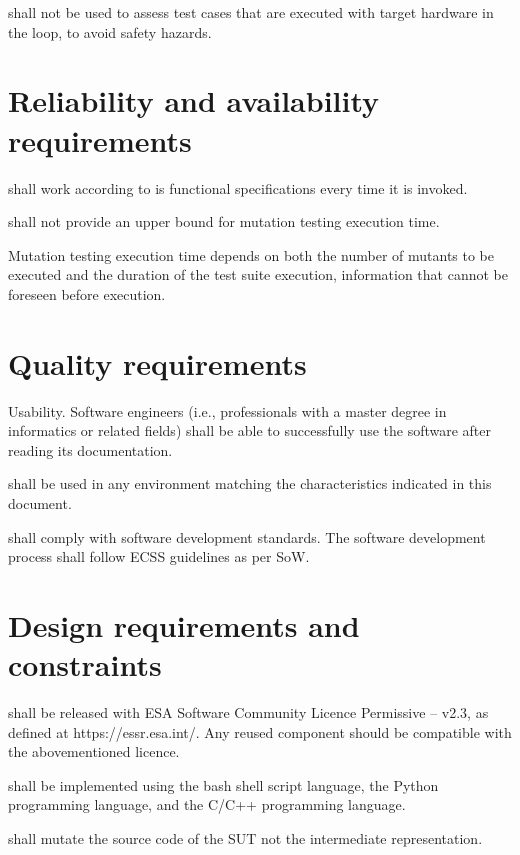 \RQ{} \FAQAS shall not be used to assess test cases that are executed with target hardware in the loop, to avoid safety hazards.

\section{Reliability and availability requirements}

\RQ{} \FAQAS shall work according to is functional specifications every time it is invoked.


\RQ{} \FAQAS shall not provide an upper bound for mutation testing execution time.

\remark Mutation testing execution time depends on both the number of mutants to be executed and the duration of the test suite execution, information that cannot be foreseen before execution.

\section{Quality requirements}

\RQ{} Usability. Software engineers (i.e., professionals with a master degree in informatics or related fields) shall be able to successfully use the software after reading its documentation.

\RQ{} \FAQAS shall be used in any environment matching the characteristics indicated in this document.

\RQ{} \FAQAS shall comply with software development standards. The software development process shall follow ECSS guidelines as per SoW.


\section{Design requirements and constraints}

\RQ{} \FAQAS shall be released with ESA Software Community Licence Permissive – v2.3, as defined at https://essr.esa.int/. Any reused component should be compatible with the abovementioned licence.

\RQ{} \FAQAS shall be implemented using the bash shell script language, the Python programming language, and the C/C++ programming language.

\RQ{} \FAQAS shall mutate the source code of the SUT not the intermediate representation.


